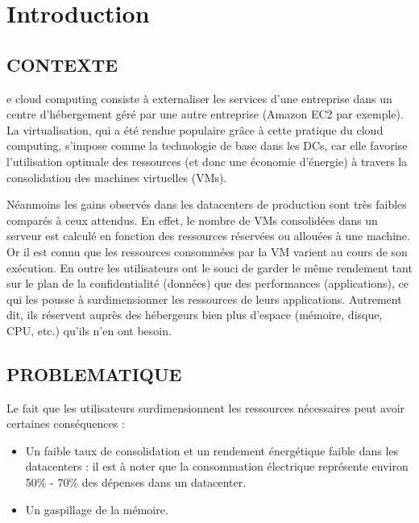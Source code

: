 %
%
\let\textcircled=\pgftextcircled
\chapter*{Introduction}
\label{chap:intro}
\section*{CONTEXTE}

e cloud computing consiste à externaliser les services d’une entreprise dans un centre d’hébergement géré par une autre entreprise (Amazon EC2 par exemple). La virtualisation, qui a été rendue populaire grâce à cette pratique du cloud computing, s'impose comme la technologie de base dans les \ac{DCs}, car elle favorise l'utilisation optimale des ressources (et donc une économie d'énergie) à travers la consolidation des machines virtuelles (VMs).
\par\noindent Néanmoins les gains observés dans les datacenters de production sont très faibles comparés à ceux attendus. En effet, le nombre de VMs consolidées dans un serveur est calculé en fonction des ressources réservées ou allouées à une machine. Or il est connu que les ressources consommées par la VM varient au cours de son exécution. En outre les utilisateurs ont le souci de garder le même rendement tant sur le plan de la confidentialité (données) que des performances (applications), ce qui les pousse à surdimensionner les ressources de leurs applications. Autrement dit, ils réservent auprès des hébergeurs bien plus d'espace (mémoire, disque, CPU, etc.) qu'ils n'en ont besoin.

\section*{PROBLEMATIQUE}

Le fait que les utilisateurs surdimensionnent les ressources nécessaires peut avoir certaines conséquences :

\begin{itemize}[label=, font=\large \color{darkorange}]
    \item Un faible taux de consolidation et un rendement énergétique faible dans les datacenters :  il est à noter que la consommation électrique représente environ 50\% - 70\% des dépenses dans un datacenter.
    \item Un gaspillage de la mémoire.
\end{itemize}

